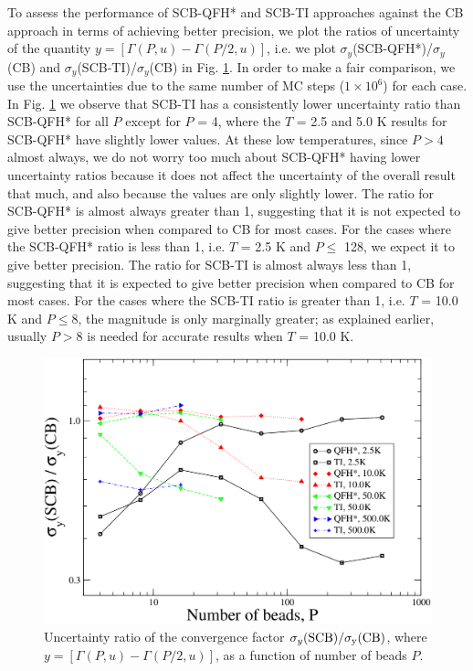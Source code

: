     To assess the performance of SCB-QFH* and SCB-TI approaches against the CB approach in terms of achieving better precision, we plot the ratios of uncertainty of the quantity $y = [\Gamma(P,u) - \Gamma(P/2,u)]$, i.e. we plot $\sigma_y$(SCB-QFH*)/$\sigma_y$(CB) and $\sigma_y$(SCB-TI)/$\sigma_y$(CB) in Fig. \ref{uncRatios}. In order to make a fair comparison, we use the uncertainties due to the same number of MC steps ($1\times10^6$) for each case. In Fig. \ref{uncRatios} we observe that SCB-TI has a consistently lower uncertainty ratio than SCB-QFH*  for all $P$ except for $P$ = 4, where the $T$ = 2.5 and 5.0 K results for SCB-QFH* have slightly lower values. At these low temperatures, since $P > 4$ almost always, we do not worry too much about SCB-QFH* having lower uncertainty ratios because it does not affect the uncertainty of the overall result that much, and also because the values are only slightly lower. The ratio for SCB-QFH* is almost always greater than 1, suggesting that it is not expected to give better precision when compared to CB for most cases. For the cases where the SCB-QFH* ratio is less than 1, i.e. $T$ = 2.5 K and $P \le$ 128, we expect it to give better precision. The ratio for SCB-TI is almost always less than 1, suggesting that it is expected to give better precision when compared to CB for most cases. For the cases where the SCB-TI ratio is greater than 1, i.e. $T$ = 10.0 K and $P \le 8$, the magnitude is only marginally greater; as explained earlier, usually $P > 8$ is needed for accurate results when $T$ = 10.0 K.
    \begin{figure}
        \centering
        \includegraphics[scale=0.3,keepaspectratio]{Chapter-3/Figures/uncRatiosOct19.png}
        \caption{Uncertainty ratio of the convergence factor $\sigma_y(\rm{SCB})/\sigma_y (\rm{CB})$, where $y = [\Gamma(P,u) - \Gamma(P/2,u)]$, as a function of number of beads $P$.} \label{uncRatios}
    \end{figure}

